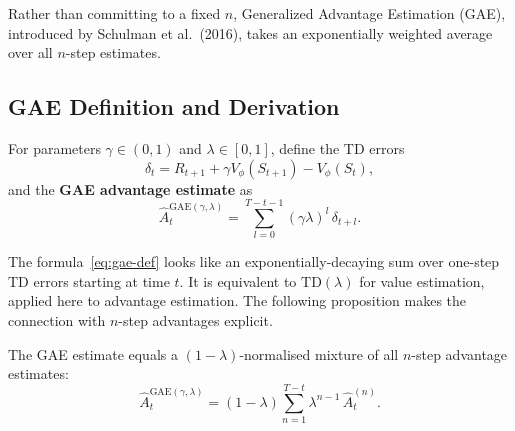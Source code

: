 Rather than committing to a fixed $n$, Generalized Advantage Estimation (GAE),
introduced by Schulman et al.~(2016), takes an exponentially weighted average
over all $n$-step estimates.

\subsection{GAE Definition and Derivation}

\begin{definition}
\label{def:gae}
For parameters $\gamma \in (0,1)$ and $\lambda \in [0,1]$, define the
TD errors
\[
\delta_t = R_{t+1} + \gamma V_\phi(S_{t+1}) - V_\phi(S_t),
\]
and the \textbf{GAE advantage estimate} as
\begin{equation}
\label{eq:gae-def}
\hat{A}_t^{\mathrm{GAE}(\gamma,\lambda)}
= \sum_{l=0}^{T-t-1} (\gamma\lambda)^l\,\delta_{t+l}.
\end{equation}
\end{definition}

The formula~\eqref{eq:gae-def} looks like an exponentially-decaying sum
over one-step TD errors starting at time $t$.  It is equivalent to
$\mathrm{TD}(\lambda)$ for value estimation, applied here to advantage
estimation.  The following proposition makes the connection with $n$-step
advantages explicit.

\begin{proposition}
\label{prop:gae-nstep}
The GAE estimate equals a $(1-\lambda)$-normalised mixture of all $n$-step
advantage estimates:
\begin{equation}
\label{eq:gae-nstep}
\hat{A}_t^{\mathrm{GAE}(\gamma,\lambda)}
= (1-\lambda)\sum_{n=1}^{T-t} \lambda^{n-1}\,\hat{A}_t^{(n)}.
\end{equation}
\end{proposition}

